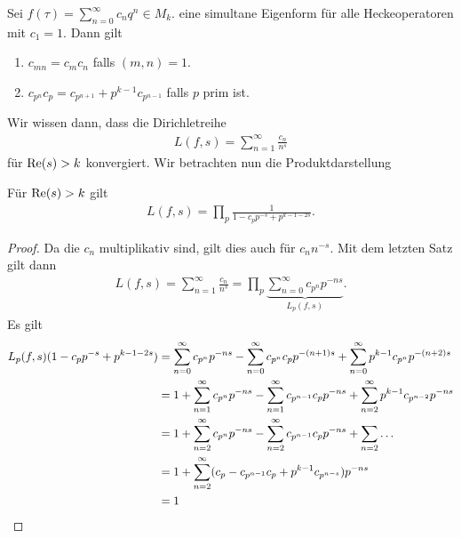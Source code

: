 Sei $f(\tau)=\sum_{n=0}^\infty c_nq^n \in M_k$. eine simultane Eigenform für alle Heckeoperatoren mit $c_1=1$. Dann gilt
\begin{enumerate}
\item $c_{mn}=c_m c_n$ falls $(m,n)=1$.
\item $c_{p^n}c_p=c_{p^{n+1}} +p^{k-1}c_{p^{n-1}}$ falls $p$ prim ist.
\end{enumerate}
Wir wissen dann, dass die Dirichletreihe
\begin{align*}
L(f,s)=\sum_{n=1}^\infty \frac{c_n}{n^s}
\end{align*}
für $\operatorname{Re}(s)>k$ konvergiert.
Wir betrachten nun die Produktdarstellung
\begin{prop}
Für $\operatorname{Re}(s)>k$ gilt
\begin{align*}
L(f,s)=\prod_p \frac{1}{1-c_pp^{-s}+p^{k-1-2s}}.
\end{align*}
\end{prop}
\begin{proof}
Da die $c_n$ multiplikativ sind, gilt dies auch für $c_nn^{-s}$.
Mit dem letzten Satz gilt dann
\begin{align*}
L(f,s)=\sum_{n=1}^\infty \frac{c_n}{n^s}=\prod_p \underbrace{\sum_{n=0}^\infty c_{p^n}p^{-ns}}_{L_p(f,s)}.
\end{align*}
Es gilt
\begin{align*}
L_p(f,s)(1-c_pp^{-s}+p^{k-1-2s})&=\sum_{n=0}^\infty c_{p^n} p^{-ns} -\sum_{n=0}^\infty c_{p^n} c_p p^{-(n+1)s}
+\sum_{n=0}^\infty p^{k-1} c_{p^n} p^{-(n+2)s}\\
&=1+\sum_{n=1}^\infty c_{p^n}p^{-ns} -\sum_{n=1}^\infty c_{p^{n-1}} c_p p^{-ns} +\sum_{n=2}^\infty p^{k-1} c_{p^{n-2}}p^{-ns}\\
&=1+\sum_{n=2}^\infty c_{p^n} p^{-ns} -\sum_{n=2}^\infty c_{p^{n-1}} c_p p^{-ns} +\sum_{n=2} \dots\\
&=1+\sum_{n=2}^\infty (c_p-c_{p^{n-1}}c_p+p^{k-1}c_{p^{n-s}})p^{-ns}\\
&=1 \qedhere
\end{align*}
\end{proof}